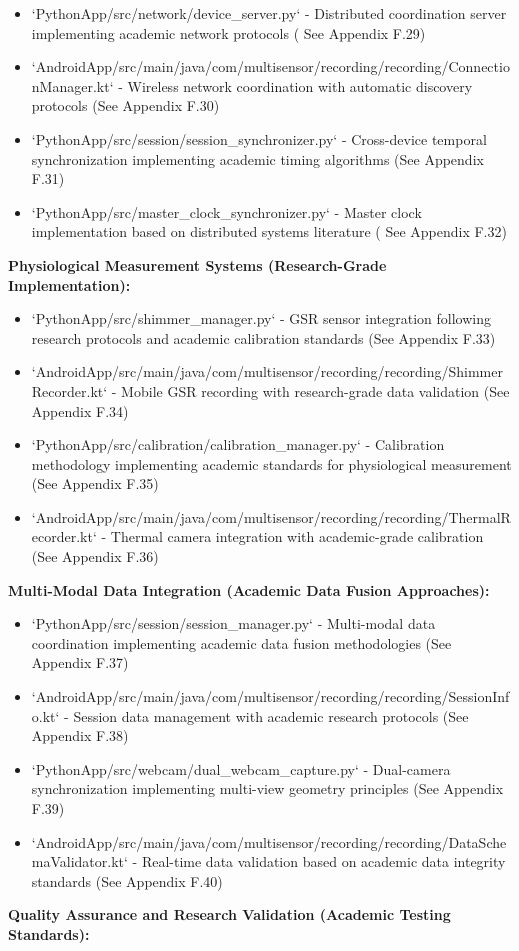 \documentclass[12pt,a4paper]{article}
\begin{document}
\begin{itemize}
\item `PythonApp/src/network/device_server.py` - Distributed coordination server implementing academic network protocols (
  See Appendix F.29)
\item `AndroidApp/src/main/java/com/multisensor/recording/recording/ConnectionManager.kt` - Wireless network coordination
  with automatic discovery protocols (See Appendix F.30)
\item `PythonApp/src/session/session_synchronizer.py` - Cross-device temporal synchronization implementing academic timing
  algorithms (See Appendix F.31)
\item `PythonApp/src/master_clock_synchronizer.py` - Master clock implementation based on distributed systems literature (
  See Appendix F.32)

\end{itemize}
\textbf{Physiological Measurement Systems (Research-Grade Implementation):}

\begin{itemize}
\item `PythonApp/src/shimmer_manager.py` - GSR sensor integration following research protocols and academic calibration
  standards (See Appendix F.33)
\item `AndroidApp/src/main/java/com/multisensor/recording/recording/ShimmerRecorder.kt` - Mobile GSR recording with
  research-grade data validation (See Appendix F.34)
\item `PythonApp/src/calibration/calibration_manager.py` - Calibration methodology implementing academic standards for
  physiological measurement (See Appendix F.35)
\item `AndroidApp/src/main/java/com/multisensor/recording/recording/ThermalRecorder.kt` - Thermal camera integration with
  academic-grade calibration (See Appendix F.36)

\end{itemize}
\textbf{Multi-Modal Data Integration (Academic Data Fusion Approaches):}

\begin{itemize}
\item `PythonApp/src/session/session_manager.py` - Multi-modal data coordination implementing academic data fusion
  methodologies (See Appendix F.37)
\item `AndroidApp/src/main/java/com/multisensor/recording/recording/SessionInfo.kt` - Session data management with academic
  research protocols (See Appendix F.38)
\item `PythonApp/src/webcam/dual_webcam_capture.py` - Dual-camera synchronization implementing multi-view geometry
  principles (See Appendix F.39)
\item `AndroidApp/src/main/java/com/multisensor/recording/recording/DataSchemaValidator.kt` - Real-time data validation
  based on academic data integrity standards (See Appendix F.40)

\end{itemize}
\textbf{Quality Assurance and Research Validation (Academic Testing Standards):}
\end{document}
